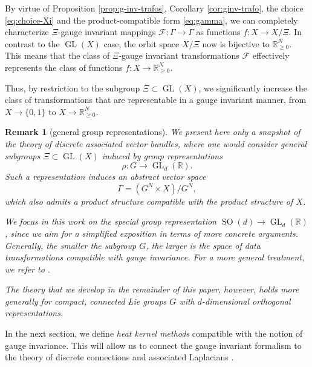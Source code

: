 \documentclass[10pt,reqno]{amsart}
\numberwithin{equation}{section}
\theoremstyle{bfnote}
\theoremstyle{bfdef}
\newtheorem{remark}[theorem]{Remark}
\newcommand{\mc}[1]{\mathcal{#1}}
\newcommand{\R}{\mathbb{R}}
\DeclareMathOperator{\SO}{SO}
\DeclareMathOperator{\GL}{GL}
\providecommand\X; %
\renewcommand{\X}{X}
\begin{document}
	By virtue of Proposition \ref{prop:g-inv-trafos}, Corollary \ref{cor:ginv-trafo}, the choice \eqref{eq:choice-Xi} and the product-compatible form \eqref{eq:gamma}, we can completely characterize $\Xi$-gauge invariant mappings $\mc{F}:\Gamma \to \Gamma$ as functions $f : \X \to \X / \Xi$. In contrast to the $\GL(\X)$ case, the orbit space $\X / \Xi$ now is bijective to $\R_{\geq 0}^{N}$. This means that the class of $\Xi$-gauge invariant transformations $\mc{F}$ effectively represents the class of functions $f : \X \to \R_{\geq 0}^{N}$.
	
	Thus, by restriction to the subgroup $\Xi \subset \GL(\X)$, we significantly increase the class of transformations that are representable in a gauge invariant manner, from $\X \to \{0,1\}$ to $\X \to \R_{\geq 0}^{N}$.
	
	\begin{remark}[general group representations]\label{rem:general-groups}
		We present here only a snapshot of the theory of discrete associated vector bundles, where one would consider general subgroups $\Xi \subset \GL(\X)$  induced by group representations 
		\begin{equation}\label{eq:rho-general}
		\rho: G \to \GL_{d}(\R).
		\end{equation}
		Such a representation induces an abstract vector space
		\begin{equation}
			\Gamma = (G^{N} \times X) / G^{N},
		\end{equation}
		which also admits a product structure compatible with the product structure of $\X$.

		We focus in this work on the special group representation $\SO(d) \to \GL_{d}(\R)$, since we aim for a simplified exposition in terms of more concrete arguments. Generally, the smaller the subgroup $G$, the larger is the space of data transformations compatible with gauge invariance. For a more general treatment, we refer to \cite{hamiltonMathematicalGaugeTheory2017,weilerCoordinateIndependentConvolutional2021,gerkenGeometricDeepLearning2021}.

		The theory that we develop in the remainder of this paper, however, holds more generally for compact, connected Lie groups $G$ with $d$-dimensional orthogonal representations.
	\end{remark}

	In the next section, we define \textit{heat kernel methods} compatible with the notion of gauge invariance. This will allow us to connect the gauge invariant formalism to the theory of discrete connections \cite{leokDiscreteTheoryConnections2005,Gattringer:2010zz} and associated Laplacians \cite{Singer:2012aa}.
\end{document}

